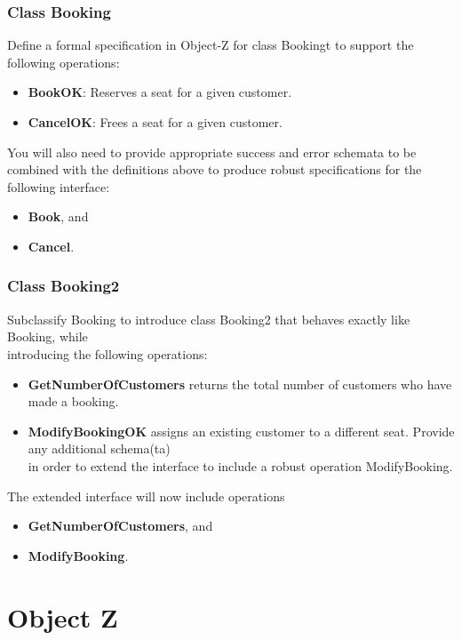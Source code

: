\documentclass[12pt]{article}
\begin{document}
\subsubsection{Class Booking}
\noindent Define a formal specification in Object-Z for class Bookingt to support the following operations:
\begin{itemize}
	\item \textbf{BookOK}: Reserves a seat for a given customer.
	\item \textbf{CancelOK}: Frees a seat for a given customer.
\end{itemize}

\noindent You will also need to provide appropriate success and error schemata to be combined with
the definitions above to produce robust specifications for the following interface:
\begin{itemize}
	\item\textbf{Book}, and
	\item \textbf{Cancel}.
\end{itemize}

\subsubsection{Class Booking2}
\noindent Subclassify Booking to introduce class Booking2 that behaves exactly like Booking, while\\
introducing the following operations:

\begin{itemize}
	\item \textbf{GetNumberOfCustomers} returns the total number of customers who have made a booking.
	\item \textbf{ModifyBookingOK} assigns an existing customer to a different seat. Provide any additional schema(ta) \\
in order to extend the interface to include a robust operation ModifyBooking.
\end{itemize}

\noindent The extended interface will now include operations
\begin{itemize}
	\item \textbf{GetNumberOfCustomers}, and
	\item \textbf{ModifyBooking}.
\end{itemize}

\newpage

\section{Object Z}
\end{document}
